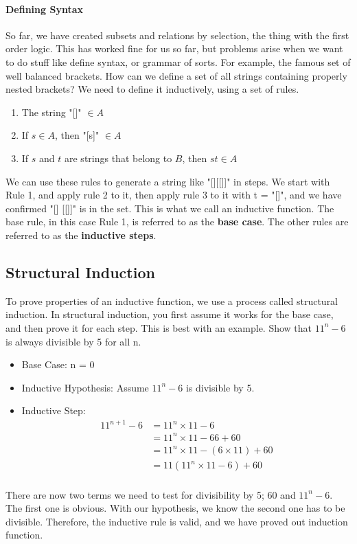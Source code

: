\paragraph{Defining Syntax} So far, we have created subsets and relations by selection, the thing with the first order logic. This has worked fine for us so far, but problems arise when we want to do stuff like define syntax, or grammar of sorts. For example, the famous set of well balanced brackets. How can we define a set of all strings containing properly nested brackets? We need to define it inductively, using a set of rules.
\begin{enumerate}
	\item The string "[]" $\in A$
	\item If $s \in A$, then "[s]" $\in A$
	\item If $s$ and $t$ are strings that belong to $B$, then $st \in A$
\end{enumerate}
We can use these rules to generate a string like "[][[]]" in steps. We start with Rule 1, and apply rule 2 to it, then apply rule 3 to it with t = "[]", and we have confirmed "[] [[]]" is in the set. This is what we call an inductive function. The base rule, in this case Rule 1, is referred to as the \textbf{base case}. The other rules are referred to as the \textbf{inductive steps}.

\subsection{Structural Induction} To prove properties of an inductive function, we use a process called structural induction. In structural induction, you first assume it works for the base case, and then prove it for each step. This is best with an example. Show that $11^n - 6$ is always divisible by 5 for all n.
\begin{itemize}
	\item Base Case: n = 0
	\item Inductive Hypothesis: Assume $11^n - 6$ is divisible by 5.
	\item Inductive Step: \[ 
	\begin{split}
	11^{n+1} - 6 &= 11^n \times 11 - 6 \\
	&=11^n \times 11 - 66 + 60 \\
	&=11^n \times 11 - (6 \times 11) + 60 \\
	&=11(11^n \times 11 - 6) + 60 \\
	\end{split}\]
\end{itemize}
There are now two terms we need to test for divisibility by 5; $60$ and $11^n - 6$. The first one is obvious. With our hypothesis, we know the second one has to be divisible. Therefore, the inductive rule is valid, and we have proved out induction function.

